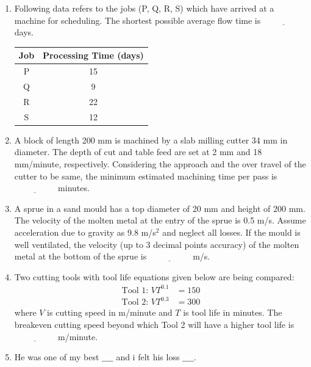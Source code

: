 \documentclass[journal]{IEEEtran}
\begin{document}
\begin{enumerate}[leftmargin=0pt]
    \item Following data refers to the jobs (P, Q, R, S) which have arrived at a machine for scheduling. The shortest possible average flow time is $\underline{\hspace{2cm}}$ days.

    \begin{tabular}{|c|c|}
        \hline
        Job & Processing Time (days) \\
        \hline
        P & 15 \\
        \hline
        Q & 9 \\
        \hline
        R & 22 \\
        \hline
        S & 12 \\
        \hline
    \end{tabular}

    \item A block of length 200 mm is machined by a slab milling cutter 34 mm in diameter. The depth of cut and table feed are set at 2 mm and 18 mm/minute, respectively. Considering the approach and the over travel of the cutter to be same, the minimum estimated machining time per pass is $\underline{\hspace{2cm}}$ minutes.

    \item A sprue in a sand mould has a top diameter of 20 mm and height of 200 mm. The velocity of the molten metal at the entry of the sprue is 0.5 m/s. Assume acceleration due to gravity as 9.8 m/s$^2$ and neglect all losses. If the mould is well ventilated, the velocity (up to 3 decimal points accuracy) of the molten metal at the bottom of the sprue is $\underline{\hspace{2cm}}$ m/s.

    \item Two cutting tools with tool life equations given below are being compared:
    \begin{align*}
        \text{Tool 1: } V T^{0.1} &= 150 \\
        \text{Tool 2: } V T^{0.3} &= 300
    \end{align*}
    where $V$ is cutting speed in m/minute and $T$ is tool life in minutes. The breakeven cutting speed beyond which Tool 2 will have a higher tool life is $\underline{\hspace{2cm}}$ m/minute.

    \item He was one of my best $\_\_\_\_$ and i felt his loss $\_\_\_\_$.
    \begin{enumerate}
    \end{enumerate}


\end{enumerate}
\end{document}
